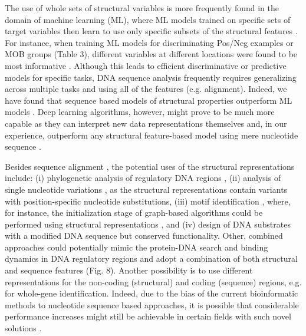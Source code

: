 \documentclass[sigconf]{acmart}
\begin{document}
The use of whole sets of structural variables is more frequently found in the domain of machine learning (ML), where ML models trained on specific sets of target variables then learn to use only specific subsets of the structural features \cite{Zrimec2015-xf,Zrimec2018-lx,Zrimec2013-ds}. For instance, when training ML models for discriminating Pos/Neg examples or MOB groups (Table 3), different variables at different locations were found to be most informative \cite{Zrimec2018-lx}. Although this leads to efficient discriminative or predictive models for specific tasks, DNA sequence analysis frequently requires generalizing across multiple tasks and using all of the features (e.g. alignment). Indeed, we have found that sequence based models of structural properties outperform ML models \cite{Zrimec2020-wx,Zrimec2018-lx}. Deep learning algorithms, however, might prove to be much more capable as they can interpret new data representations themselves \cite{Bengio2013-xg} and, in our experience, outperform any structural feature-based model using mere nucleotide sequence \cite{Zrimec2019-ql}.

Besides sequence alignment \cite{Zrimec2020-wx}, the potential uses of the structural representations include: (i) phylogenetic analysis of regulatory DNA regions \cite{Garcillan-Barcia2009-yk}, (ii) analysis of single nucleotide variations \cite{Watson2008-dt}, as the structural representations contain variants with position-specific nucleotide substitutions, (iii) motif identification \cite{Samee2019-xj}, where, for instance, the initialization stage of graph-based algorithms could be performed using structural representations \cite{Stepancic2014-yu}, and (iv) design of DNA substrates with a modified DNA sequence but conserved functionality. Other, combined approaches could potentially mimic the protein-DNA search and binding dynamics in DNA regulatory regions \cite{Marcovitz2013-kg,Levo2015-iu,Slattery2014-ne,Rohs2009-hm} and adopt a combination of both structural and sequence features (Fig. 8). Another possibility is to use different representations for the non-coding (structural) and coding (sequence) regions, e.g. for whole-gene identification. Indeed, due to the bias of the current bioinformatic methods to nucleotide sequence based approaches, it is possible that considerable performance increases might still be achievable in certain fields with such novel solutions \cite{Zrimec2020-wx, Samee2019-xj}.
\end{document}
